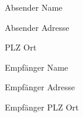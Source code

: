 \documentclass{letter}
\begin{document}
  
Absender Name
   
Absender Adresse
   
PLZ Ort
     
\vspace{1.0in}\large
\setlength\parindent{3.6in}
      
Empf\"anger Name
       
Empf\"anger Adresse
        
Empf\"anger PLZ Ort
 
\end{document}
